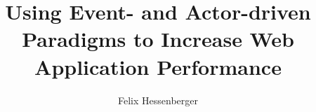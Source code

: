 \documentclass[master, english]{hgbthesis}
\begin{document}
\title{Using Event- and Actor-driven Paradigms to Increase Web Application Performance}

\author{Felix Hessenberger}

\frontmatter
\maketitle
\tableofcontents 
	
			

		

\mainmatter	












 
\appendix



\end{document}
